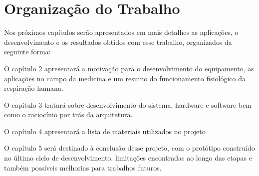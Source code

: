   \section{Organização do Trabalho}
  Nos próximos capítulos serão apresentados em mais detalhes as aplicações, o desenvolvimento e os resultados obtidos com esse trabalho, organizados da seguinte forma:
  
  O capítulo 2 apresentará a motivação para o desenvolvimento do equipamento, as aplicações no campo da medicina e um resumo do funcionamento fisiológico da respiração humana. 
  
  O capítulo 3 tratará sobre desenvolvimento do sistema, hardware e software bem como o raciocínio por trás da arquitetura.
  
  O capítulo 4 apresentará a lista de materiais utilizados no projeto
  
  O capítulo 5 será destinado à conclusão desse projeto, com o protótipo construído no último ciclo de desenvolvimento, limitações encontradas ao longo das etapas e também possíveis melhorias para trabalhos futuros.
 